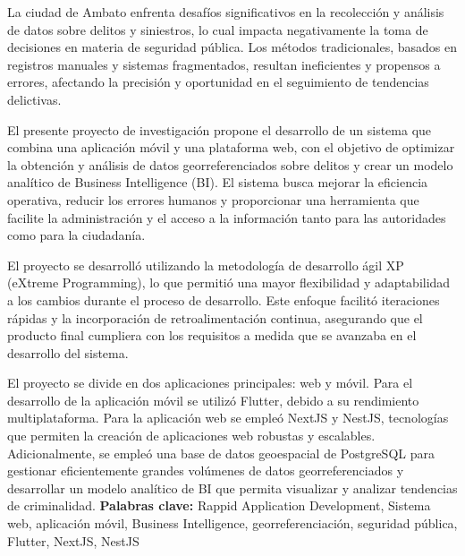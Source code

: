 La ciudad de Ambato enfrenta desafíos significativos en la recolección y análisis de datos sobre
delitos y siniestros, lo cual impacta negativamente la toma de decisiones en materia de seguridad
pública. Los métodos tradicionales, basados en registros manuales y sistemas fragmentados, resultan
ineficientes y propensos a errores, afectando la precisión y oportunidad en el seguimiento de
tendencias delictivas.
\bigbreak

El presente proyecto de investigación propone el desarrollo de un sistema que combina una aplicación
móvil y una plataforma web, con el objetivo de optimizar la obtención y análisis de datos georreferenciados
sobre delitos y crear un modelo analítico de Business Intelligence (BI). El sistema busca mejorar
la eficiencia operativa, reducir los errores humanos y proporcionar una herramienta que facilite la
administración y el acceso a la información tanto para las autoridades como para la ciudadanía.
\bigbreak

El proyecto se desarrolló utilizando la metodología de desarrollo ágil XP (eXtreme Programming), lo
que permitió una mayor flexibilidad y adaptabilidad a los cambios durante el proceso de desarrollo.
Este enfoque facilitó iteraciones rápidas y la incorporación de retroalimentación continua, asegurando
que el producto final cumpliera con los requisitos a medida que se avanzaba en el desarrollo del sistema.
\bigbreak

El proyecto se divide en dos aplicaciones principales: web y móvil. Para el desarrollo de la aplicación
móvil se utilizó Flutter, debido a su rendimiento multiplataforma. Para la aplicación web se empleó
NextJS y NestJS, tecnologías que permiten la creación de aplicaciones web robustas y escalables.
Adicionalmente, se empleó una base de datos geoespacial de PostgreSQL para gestionar eficientemente
grandes volúmenes  de datos georreferenciados y desarrollar un modelo analítico de BI que permita
visualizar y analizar tendencias de criminalidad.
\vfill
\textbf{Palabras clave:} Rappid Application Development, Sistema web, aplicación móvil, Business Intelligence,
georreferenciación, seguridad pública, Flutter, NextJS, NestJS
